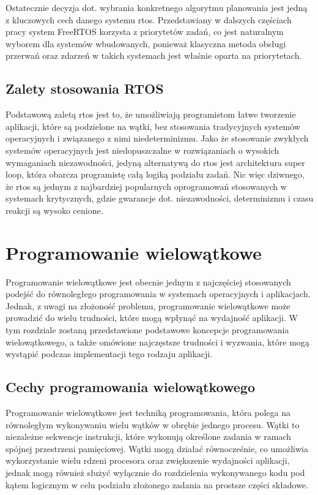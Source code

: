 Ostatecznie decyzja dot. wybrania konkretnego algorytmu planowania jest jedną z kluczowych cech danego systemu \gls{rtos}.
Przedstawiany w dalszych częściach pracy system FreeRTOS korzysta z priorytetów zadań, co jest naturalnym wyborem dla
systemów wbudowanych, ponieważ klasyczna metoda obsługi przerwań oraz zdarzeń w takich systemach jest właśnie oparta na priorytetach.


\subsection{Zalety stosowania RTOS}
Podstawową zaletą \gls{rtos} jest to, że umożliwiają programistom łatwe tworzenie aplikacji, które są podzielone na wątki,
bez stosowania tradycyjnych systemów operacyjnych i związanego z nimi niedeterminizmu.
Jako że stosowanie zwykłych systemów operacyjnych jest niedopuszczalne w rozwiązaniach o wysokich wymaganiach niezawodności,
jedyną alternatywą do \gls{rtos} jest architektura \gls{super loop}, która obarcza programistę całą logiką podziału zadań.
Nic więc dziwnego, że \gls{rtos} są jednym z najbardziej popularnych oprogramowań stosowanych w systemach krytycznych,
gdzie gwarancje dot. niezawodności, determinizmu i czasu reakcji są wysoko cenione.

\section{Programowanie wielowątkowe}
Programowanie wielowątkowe jest obecnie jednym z najczęściej stosowanych podejść do równoległego programowania
w systemach operacyjnych i aplikacjach. Jednak, z uwagi na złożoność problemu, programowanie wielowątkowe może prowadzić do wielu trudności,
które mogą wpłynąć na wydajność aplikacji. W tym rozdziale zostaną przedstawione podstawowe koncepcje programowania wielowątkowego,
a także omówione najczęstsze trudności i wyzwania, które mogą wystąpić podczas implementacji tego rodzaju aplikacji.

\subsection{Cechy programowania wielowątkowego}
Programowanie wielowątkowe jest techniką programowania, która polega na równoległym wykonywaniu wielu wątków w obrębie jednego procesu.
Wątki to niezależne sekwencje instrukcji, które wykonują określone zadania w ramach spójnej przestrzeni pamięciowej.
Wątki mogą działać równocześnie, co umożliwia wykorzystanie wielu rdzeni procesora oraz zwiększenie wydajności aplikacji,
jednak mogą również służyć wyłącznie do rozdzielenia wykonywanego kodu pod kątem logicznym w celu podziału złożonego zadania na prostsze
części składowe.

